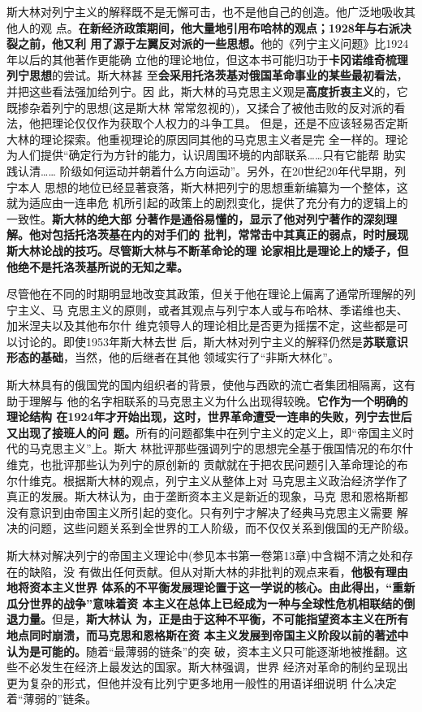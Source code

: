 斯大林对列宁主义的解释既不是无懈可击，也不是他自己的创造。他广泛地吸收其他人的观
点。\textbf{在新经济政策期间，他大量地引用布哈林的观点；1928年与右派决裂之前，他又利
  用了源于左翼反对派的一些思想。}他的《列宁主义问题》比1924年以后的其他著作更能确
立他的理论地位，但这本书可能归功于\textbf{卡冈诺维奇梳理列宁思想}的尝试。斯大林甚
至\textbf{会采用托洛茨基对俄国革命事业的某些最初看法}，并把这些看法强加给列宁。因
此，斯大林的马克思主义观是\textbf{高度折衷主义}的，它既掺杂着列宁的思想(这是斯大林
常常忽视的)，又揉合了被他击败的反对派的看法，他把理论仅仅作为获取个人权力的斗争工具。
但是，还是不应该轻易否定斯大林的理论探索。他重视理论的原因同其他的马克思主义者是完
全一样的。理论为人们提供“确定行为方针的能力，认识周围环境的内部联系……只有它能帮
助实践认清…… 阶级如何运动并朝着什么方向运动”。另外，在20世纪20年代早期，列宁本人
思想的地位已经显著衰落，斯大林把列宁的思想重新编纂为一个整体，这就为适应由一连串危
机所引起的政策上的剧烈变化，提供了充分有力的逻辑上的一致性。\textbf{斯大林的绝大部
  分著作是通俗易懂的，显示了他对列宁著作的深刻理解。他对包括托洛茨基在内的对手们的
  批判，常常击中其真正的弱点，时时展现斯大林论战的技巧。尽管斯大林与不断革命论的理
  论家相比是理论上的矮子，但他绝不是托洛茨基所说的无知之辈。}

尽管他在不同的时期明显地改变其政策，但关于他在理论上偏离了通常所理解的列宁主义、马
克思主义的原则，或者其观点与列宁本人或与布哈林、季诺维也夫、加米涅夫以及其他布尔什
维克领导人的理论相比是否更为摇摆不定，这些都是可以讨论的。即使1953年斯大林去世
后，斯大林对列宁主义的解释仍然是\textbf{苏联意识形态的基础}，当然，他的后继者在其他
领域实行了“非斯大林化”。

斯大林具有的俄国党的国内组织者的背景，使他与西欧的流亡者集团相隔离，这有助于理解与
他的名字相联系的马克思主义为什么出现得较晚。\textbf{它作为一个明确的理论结构
  在1924年才开始出现，这时，世界革命遭受一连串的失败，列宁去世后又出现了接班人的问
  题。}所有的问题都集中在列宁主义的定义上，即“帝国主义时代的马克思主义”上。斯大
林批评那些强调列宁的思想完全基于俄国情况的布尔什维克，也批评那些认为列宁的原创新的
贡献就在于把农民问题引入革命理论的布尔什维克。根据斯大林的观点，列宁主义从整体上对
马克思主义政治经济学作了真正的发展。斯大林认为，由于垄断资本主义是新近的现象，马克
思和恩格斯都没有意识到由帝国主义所引起的变化。只有列宁才解决了经典马克思主义需要
解决的问题，这些问题关系到全世界的工人阶级，而不仅仅关系到俄国的无产阶级。

斯大林对解决列宁的帝国主义理论中(参见本书第一卷第13章)中含糊不清之处和存在的缺陷，没
有做出任何贡献。但从对斯大林的非批判的观点来看，\textbf{他极有理由地将资本主义世界
  体系的不平衡发展理论置于这一学说的核心。由此得出，“重新瓜分世界的战争”意味着资
  本主义在总体上已经成为一种与全球性危机相联结的倒退力量。}但是，\textbf{斯大林认
  为，正是由于这种不平衡，不可能指望资本主义在所有地点同时崩溃，而马克思和恩格斯在资
  本主义发展到帝国主义阶段以前的著述中认为是可能的。}随着“最薄弱的链条”的突
破，资本主义只可能逐渐地被推翻。这些不必发生在经济上最发达的国家。斯大林强调，世界
经济对革命的制约呈现出更为复杂的形式，但他并没有比列宁更多地用一般性的用语详细说明
什么决定着“薄弱的”链条。

